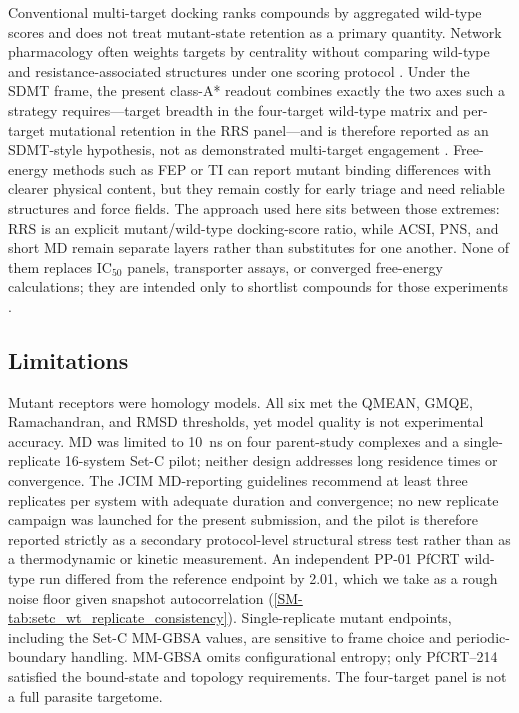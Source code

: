 \documentclass[journal=jcisd8,manuscript=article,layout=traditional]{achemso}
\begin{document}
Conventional multi-target docking ranks compounds by aggregated wild-type scores and does not treat mutant-state retention as a primary quantity. Network pharmacology often weights targets by centrality without comparing wild-type and resistance-associated structures under one scoring protocol \citep{Sentinel2025Offtarget}. Under the SDMT frame, the present class-A* readout combines exactly the two axes such a strategy requires---target breadth in the four-target wild-type matrix and per-target mutational retention in the RRS panel---and is therefore reported as an SDMT-style hypothesis, not as demonstrated multi-target engagement \citep{sdmt2026trends}. Free-energy methods such as FEP or TI can report mutant binding differences with clearer physical content, but they remain costly for early triage and need reliable structures and force fields. The approach used here sits between those extremes: RRS is an explicit mutant/wild-type docking-score ratio, while ACSI, PNS, and short MD remain separate layers rather than substitutes for one another. None of them replaces IC$_{50}$ panels, transporter assays, or converged free-energy calculations; they are intended only to shortlist compounds for those experiments \citep{temgoua2026quantum,multi_target_antimalarials_2025}.

\subsection{Limitations}

Mutant receptors were homology models. All six met the QMEAN, GMQE, Ramachandran, and RMSD thresholds, yet model quality is not experimental accuracy. MD was limited to 10~ns on four parent-study complexes and a single-replicate 16-system Set-C pilot; neither design addresses long residence times or convergence. The JCIM MD-reporting guidelines \citep{soares2023mdreport} recommend at least three replicates per system with adequate duration and convergence; no new replicate campaign was launched for the present submission, and the pilot is therefore reported strictly as a secondary protocol-level structural stress test rather than as a thermodynamic or kinetic measurement. An independent PP-01 PfCRT wild-type run differed from the reference endpoint by \qty{2.01}{\kcalmol}, which we take as a rough noise floor given snapshot autocorrelation (\cref{SM-tab:setc_wt_replicate_consistency}). Single-replicate mutant endpoints, including the Set-C MM-GBSA values, are sensitive to frame choice and periodic-boundary handling. MM-GBSA omits configurational entropy; only PfCRT--214 satisfied the bound-state and topology requirements. The four-target panel is not a full parasite targetome.
\end{document}
